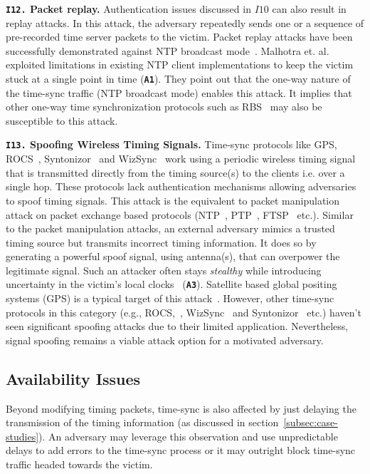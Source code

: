 \noindent\textbf{\texttt{I12.} Packet replay.} Authentication issues discussed in $I10$ can also result in replay attacks. In this attack, the adversary repeatedly sends one or a sequence of pre-recorded time server packets to the victim. Packet replay attacks have been successfully demonstrated against NTP broadcast mode~\cite{ntp-replay-drop-attack}. Malhotra et. al. exploited limitations in existing NTP client implementations to keep the victim stuck at a single point in time (\textbf{\texttt{A1}}). They point out that the one-way nature of the time-sync traffic (NTP broadcast mode) enables this attack. It implies that other one-way time synchronization protocols such as RBS~\cite{Elson2003RBS} may also be susceptible to this attack.

\noindent\textbf{\texttt{I13.} Spoofing Wireless Timing Signals.} Time-sync protocols like GPS, ROCS~\cite{ROCS-FM-Beacons}, Syntonizor~\cite{Syntonizor-AC-powerlines} and WizSync~\cite{WizSync-Wifi-Beacons} work using a periodic wireless timing signal that is transmitted directly from the timing source(s) to the clients i.e. over a single hop. These protocols lack authentication mechanisms allowing adversaries to spoof timing signals. This attack is the equivalent to packet manipulation attack on packet exchange based protocols (NTP~\cite{nts-rfc}, PTP~\cite{ptp-std-doc}, FTSP~\cite{ftsp-2004} etc.). Similar to the packet manipulation attacks, an external adversary mimics a trusted timing source but transmits incorrect timing information. It does so by generating a powerful spoof signal, using antenna(s), that can overpower the legitimate signal. Such an attacker often stays \textit{stealthy} while introducing uncertainty in the victim's local clocks~\cite{gps-spoofing-fundamentals} (\textbf{\texttt{A3}}). Satellite based global positing systems (GPS) is a typical target of this attack~\cite{gps-spoofing-21}. However, other time-sync protocols in this category (e.g., ROCS,~\cite{ROCS-FM-Beacons}, WizSync~\cite{WizSync-Wifi-Beacons} and Syntonizor~\cite{Syntonizor-AC-powerlines} etc.) haven't seen significant spoofing attacks due to their limited application. Nevertheless, signal spoofing remains a viable attack option for a motivated adversary.

\subsection{Availability Issues}
Beyond modifying timing packets, time-sync is also affected by just delaying the transmission of the timing information (as discussed in section~\ref{subsec:case-studies}). An adversary may leverage this observation and use unpredictable delays to add errors to the time-sync process or it  may outright block time-sync traffic headed towards the victim. 

